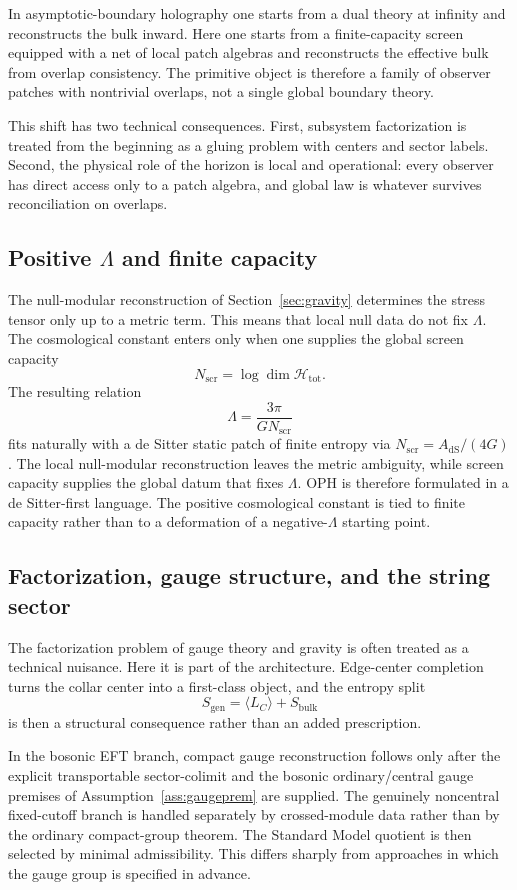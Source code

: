 \documentclass[11pt]{article}
\begin{document}
In asymptotic-boundary holography one starts from a dual theory at infinity and reconstructs the bulk inward. Here one starts from a finite-capacity screen equipped with a net of local patch algebras and reconstructs the effective bulk from overlap consistency. The primitive object is therefore a family of observer patches with nontrivial overlaps, not a single global boundary theory.

This shift has two technical consequences. First, subsystem factorization is treated from the beginning as a gluing problem with centers and sector labels. Second, the physical role of the horizon is local and operational: every observer has direct access only to a patch algebra, and global law is whatever survives reconciliation on overlaps.

\subsection{Positive $\Lambda$ and finite capacity}

The null-modular reconstruction of Section~\ref{sec:gravity} determines the stress tensor only up to a metric term. This means that local null data do not fix $\Lambda$. The cosmological constant enters only when one supplies the global screen capacity
\[
N_{\mathrm{scr}}=\log\dim\mathcal H_{\mathrm{tot}}.
\]
The resulting relation
\[
\Lambda=\frac{3\pi}{G N_{\mathrm{scr}}}
\]
fits naturally with a de Sitter static patch of finite entropy via $N_{\mathrm{scr}}=A_{\mathrm{dS}}/(4G)$. The local null-modular reconstruction leaves the metric ambiguity, while screen capacity supplies the global datum that fixes \(\Lambda\). OPH is therefore formulated in a de Sitter-first language. The positive cosmological constant is tied to finite capacity rather than to a deformation of a negative-$\Lambda$ starting point.

\subsection{Factorization, gauge structure, and the string sector}

The factorization problem of gauge theory and gravity is often treated as a technical nuisance. Here it is part of the architecture. Edge-center completion turns the collar center into a first-class object, and the entropy split
\[
S_{\mathrm{gen}}=\langle L_C\rangle + S_{\mathrm{bulk}}
\]
is then a structural consequence rather than an added prescription.

In the bosonic EFT branch, compact gauge reconstruction follows only after the explicit transportable sector-colimit and the bosonic ordinary/central gauge premises of Assumption~\ref{ass:gaugeprem} are supplied. The genuinely noncentral fixed-cutoff branch is handled separately by crossed-module data rather than by the ordinary compact-group theorem. The Standard Model quotient is then selected by minimal admissibility. This differs sharply from approaches in which the gauge group is specified in advance.
\end{document}
